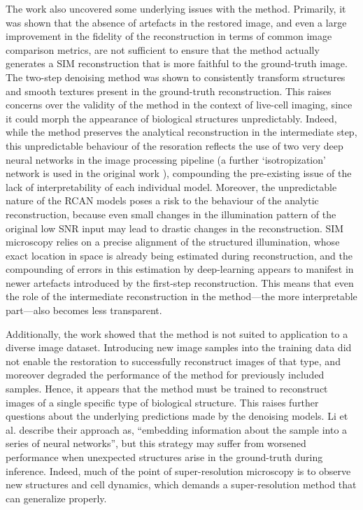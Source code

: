 \documentclass[12pt]{article}
\begin{document}
The work also uncovered some underlying issues with the method.
Primarily, it was shown that the absence of artefacts in the restored image,
and even a large improvement in the fidelity of the reconstruction in terms of common image comparison metrics,
are not sufficient to ensure that the method actually generates a SIM reconstruction that is more faithful to the ground-truth image.
The two-step denoising method was shown to consistently transform structures and smooth textures present in the ground-truth reconstruction.
This raises concerns over the validity of the method in the context of live-cell imaging,
since it could morph the appearance of biological structures unpredictably.
Indeed, while the method preserves the analytical reconstruction in the intermediate step,
this unpredictable behaviour of the resoration reflects the use of two very deep neural networks in the image processing pipeline
(a further `isotropization' network is used in the original work \cite{keypaper}),
compounding the pre-existing issue of the lack of interpretability of each individual model.
Moreover, the unpredictable nature of the RCAN models poses a risk to the behaviour of the analytic reconstruction,
because even small changes in the illumination pattern of the original low SNR input may lead to drastic changes in the reconstruction.
SIM microscopy relies on a precise alignment of the structured illumination,
whose exact location in space is already being estimated during reconstruction,
and the compounding of errors in this estimation by deep-learning appears to manifest in newer artefacts introduced by the first-step reconstruction.
This means that even the role of the intermediate reconstruction in the method---the more interpretable part---also becomes less transparent.

Additionally, the work showed that the method is not suited to application to a diverse image dataset.
Introducing new image samples into the training data did not enable the restoration to successfully reconstruct images of that type,
and moreover degraded the performance of the method for previously included samples.
Hence, it appears that the method must be trained to reconstruct images of a single specific type of biological structure.
This raises further questions about the underlying predictions made by the denoising models.
Li et al. describe their approach as, ``embedding information about the sample into a series of neural networks''\cite{keypaper},
but this strategy may suffer from worsened performance when unexpected structures arise in the ground-truth during inference.
Indeed, much of the point of super-resolution microscopy is to observe new structures and cell dynamics,
which demands a super-resolution method that can generalize properly.
\end{document}
